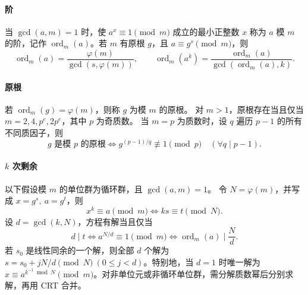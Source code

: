 \paragraph{阶} 当 $\gcd(a,m)=1$ 时，使 $a^x\equiv1\pmod m$ 成立的最小正整数 $x$
称为 $a$ 模 $m$ 的阶，记作 $\operatorname{ord}_m(a)$。若 $m$ 有原根 $g$，且
$a\equiv g^s\pmod m$，则
\[
\operatorname{ord}_m(a)=\frac{\varphi(m)}{\gcd(s,\varphi(m))},\qquad
\operatorname{ord}_m(a^k)=
\frac{\operatorname{ord}_m(a)}{\gcd(\operatorname{ord}_m(a),k)}.
\]

\paragraph{原根} 若 $\operatorname{ord}_m(g)=\varphi(m)$，则称 $g$ 为模 $m$ 的原根。
对 $m>1$，原根存在当且仅当 $m=2,4,p^e,2p^e$，其中 $p$ 为奇质数。
当 $m=p$ 为质数时，设 $q$ 遍历 $p-1$ 的所有不同质因子，则
\[
g\text{ 是模 }p\text{ 的原根}
\iff g^{(p-1)/q}\not\equiv1\pmod p\quad(\forall q\mid p-1).
\]

\paragraph{$k$ 次剩余} 以下假设模 $m$ 的单位群为循环群，且 $\gcd(a,m)=1$。
令 $N=\varphi(m)$，并写成 $x=g^s,\ a=g^t$，则
\[
x^k\equiv a\pmod m\iff ks\equiv t\pmod N.
\]
设 $d=\gcd(k,N)$，方程有解当且仅当
\[
d\mid t
\iff a^{N/d}\equiv1\pmod m
\iff \operatorname{ord}_m(a)\mid\frac Nd.
\]
若 $s_0$ 是线性同余的一个解，则全部 $d$ 个解为
$s=s_0+jN/d\pmod N\ (0\le j<d)$。特别地，当 $d=1$ 时唯一解为
$x\equiv a^{k^{-1}\bmod N}\pmod m$。对非单位元或非循环单位群，需分解质数幂后分别求解，再用 CRT 合并。
